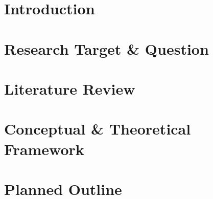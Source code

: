 \documentclass[12pt,a4paper]{report}
\begin{document}
\begin{titlepage}
	
\end{titlepage}

\section*{Introduction}



\section*{Research Target \& Question}



\section*{Literature Review}



\section*{Conceptual \& Theoretical Framework}



\section*{Planned Outline}



\printbibliography
\end{document}
